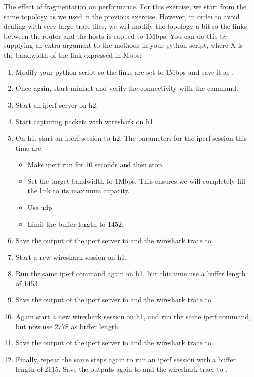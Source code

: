 \begin{exercise}{The effect of fragmentation on performance.}
For this exercise, we start from the same topology as we used in the previous exercise. However, in order to avoid dealing with very large trace files, we will modify the topology a bit so the links between the router and the hosts is capped to 1Mbps. You can do this by supplying an extra argument  to the  methods in your python script, where X is the bandwidth of the link expressed in Mbps:
\begin{cmdblock}[gobble=3]
\end{cmdblock}
\begin{enumerate}
	\item Modify your python script so the links are set to 1Mbps and save it as .
	\item Once again, start mininet and verify the connectivity with the  command.
	\item Start an iperf server on h2.
	\item Start capturing packets with wireshark on h1.
	\item On h1, start an iperf session to h2. The parameters for the iperf session this time are:
	\begin{itemize}
		\item Make iperf run for 10 seconds and then stop.
		\item Set the target bandwidth to 1Mbps. This ensures we will completely fill the link to its maximum capacity.
		\item Use \ac{udp}
		\item Limit the buffer length to 1452.
	\end{itemize}
	\item Save the output of the iperf server to  and the wireshark trace to .
	\item Start a new wireshark session on h1.
	\item Run the same iperf command again on h1, but this time use a buffer length of 1453.
	\item Save the output of the iperf server to  and the wireshark trace to .
	\item Again start a new wireshark session on h1, and run the same iperf command, but now use 2778 as buffer length.
	\item Save the output of the iperf server to  and the wireshark trace to .
	\item Finally, repeat the same steps again to run an iperf session with a buffer length of 2115. Save the outputs again to  and the wireshark trace to .
\end{enumerate}


\end{exercise}
